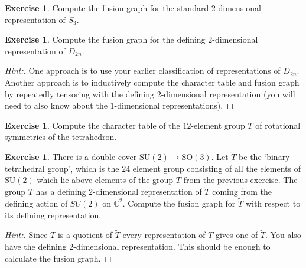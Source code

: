 \documentclass[11pt]{article}
\theoremstyle{plain}
\theoremstyle{definition}
\newtheorem{exercise}[proposition]{Exercise}
\theoremstyle{remark}
\begin{document}
\begin{exercise}
Compute the fusion graph for the standard $2$-dimensional representation of $S_3$.
\end{exercise}

\begin{exercise}
Compute the fusion graph for the defining $2$-dimensional representation of $D_{2n}$.
\end{exercise}
\begin{proof}[Hint:]
One approach is to use your earlier classification of representations of $D_{2n}$.  Another approach is to inductively compute the character table and fusion graph by repeatedly tensoring with the defining $2$-dimensional representation (you will need to also know about the $1$-dimensional representations).
\end{proof}

\begin{exercise}
Compute the character table of the $12$-element group $T$ of rotational symmetries of the tetrahedron.
\end{exercise}

\begin{exercise}
There is a double cover $\mathrm{SU}(2) \rightarrow \mathrm{SO}(3)$.  Let $\tilde{T}$ be the `binary tetrahedral group', which is the $24$ element group consisting of all the elements of $\mathrm{SU}(2)$ which lie above elements of the group $T$ from the previous exercise.  The group $\tilde{T}$ has a  defining $2$-dimensional representation of $\tilde{T}$ coming from the defining action of $SU(2)$ on $\mathbb{C}^2$.  Compute the fusion graph for $\tilde{T}$ with respect to its defining representation.
\end{exercise}
\begin{proof}[Hint:]
Since $T$ is a quotient of $\tilde{T}$ every representation of $T$ gives one of $\tilde{T}$.  You also have the defining $2$-dimensional representation.  This should be enough to calculate the fusion graph.
\end{proof}
\end{document}
